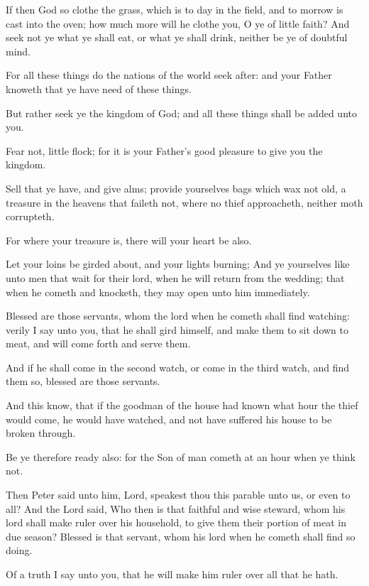 \verse If then God so clothe the grass, which is to day in the field, and to morrow is cast into the oven; how much more will he clothe you, O ye of little faith?  \verse And seek not ye what ye shall eat, or what ye shall drink, neither be ye of doubtful mind.

\verse For all these things do the nations of the world seek after: and your Father knoweth that ye have need of these things.

\verse But rather seek ye the kingdom of God; and all these things shall be added unto you.

\verse Fear not, little flock; for it is your Father's good pleasure to give you the kingdom.

\verse Sell that ye have, and give alms; provide yourselves bags which wax not old, a treasure in the heavens that faileth not, where no thief approacheth, neither moth corrupteth.

\verse For where your treasure is, there will your heart be also.

\verse Let your loins be girded about, and your lights burning; \verse And ye yourselves like unto men that wait for their lord, when he will return from the wedding; that when he cometh and knocketh, they may open unto him immediately.

\verse Blessed are those servants, whom the lord when he cometh shall find watching: verily I say unto you, that he shall gird himself, and make them to sit down to meat, and will come forth and serve them.

\verse And if he shall come in the second watch, or come in the third watch, and find them so, blessed are those servants.

\verse And this know, that if the goodman of the house had known what hour the thief would come, he would have watched, and not have suffered his house to be broken through.

\verse Be ye therefore ready also: for the Son of man cometh at an hour when ye think not.

\verse Then Peter said unto him, Lord, speakest thou this parable unto us, or even to all?  \verse And the Lord said, Who then is that faithful and wise steward, whom his lord shall make ruler over his household, to give them their portion of meat in due season?  \verse Blessed is that servant, whom his lord when he cometh shall find so doing.

\verse Of a truth I say unto you, that he will make him ruler over all that he hath.

